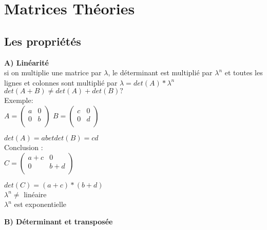 
\newpage
\chapter{Matrices Théories}
\section{Les propriétés}
\vspace{3mm} %

\textbf{A) Linéarité }\\

si on multiplie une matrice par $\lambda$, le déterminant est multiplié par $\lambda^{n}$ et toutes les lignes et colonnes sont multiplié par $\lambda=det(A)*\lambda^{n}$ \\

$det(A+B) \neq det(A)+det(B) ?$ \\

Exemple:\\

$
A =
\begin{pmatrix}
  a & 0 \\
  0 & b \\
\end{pmatrix}
$
\vspace{3mm} %
$
B =
\begin{pmatrix}
  c & 0 \\
  0 & d \\
\end{pmatrix}
$

$det(A)=ab et det(B)=cd $ \\

Conclusion : \\

$
C =
\begin{pmatrix}
  a+c & 0 \\
  0 & b+d \\
\end{pmatrix}
$

\vspace{3mm} %
$det(C)=(a+c)*(b+d)$ \\


\vspace{3mm} %
$\lambda^{n} \neq$ linéaire \\
$\lambda^{n}$ est exponentielle

\vspace{6mm} %
\textbf{B) Déterminant et transposée} \\

